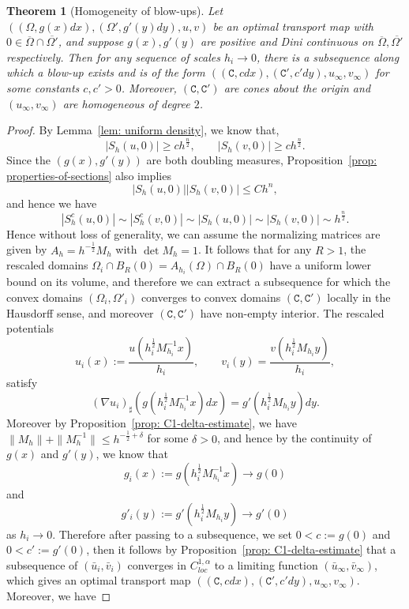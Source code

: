 \documentclass[12pt,reqno]{amsart}
\newtheorem{theorem}{Theorem}[section]
\numberwithin{equation}{section}
\begin{document}
    \begin{theorem}[Homogeneity of blow-ups]\label{thm: homog-of-blowup-lebesgue-measure}
	   Let $((\Omega, g(x)dx), (\Omega', g'(y)dy), u, v)$ be an optimal transport map with $0\in \overline\Omega \cap \overline{\Omega'}$, and suppose $g(x), g'(y)$ are positive and Dini continuous on $\overline\Omega, \overline{\Omega'}$ respectively. Then for any sequence of scales $h_i\to 0$, there is a subsequence along which a blow-up exists and is of the form $((\mathtt C, cdx), (\mathtt C', c'dy), u_{\infty}, v_{\infty})$ for some constants $c, c'>0$. Moreover, $(\mathtt C, \mathtt C')$ are cones about the origin and $(u_{\infty}, v_{\infty})$ are homogeneous of degree $2$. 
	\end{theorem}
        \begin{proof}By Lemma~\ref{lem: uniform density}, we know that,  
        \[|S_h(u, 0)|\geq ch^{\frac n 2},\qquad |S_h(v, 0)|\geq ch^{\frac n 2}.\] Since the $(g(x), g'(y))$ are both doubling measures, Proposition~\ref{prop: properties-of-sections} also implies \[|S_h(u, 0)||S_h(v, 0)|\leq Ch^n,\] and hence we have
        \[|S_h^c(u, 0)|\sim |S_h^c(v, 0)|\sim |S_h(u, 0)|\sim|S_h(v, 0)|\sim h^{\frac n 2}.\]
        Hence without loss of generality, we can assume the normalizing matrices are given by $A_h = h^{-\frac 1 2}M_h$ with $\det M_h = 1$. It follows that for any $R>1$, the rescaled domains $\Omega_i\cap B_R(0) = A_{h_i}(\Omega)\cap B_R(0)$ have a uniform lower bound on its volume, and therefore we can extract a subsequence for which the convex domains $(\Omega_i, \Omega'_i)$ converges to convex domains $(\mathtt C, \mathtt C')$ locally in the Hausdorff sense, and moreover $(\mathtt C, \mathtt C')$ have non-empty interior. 
        The rescaled potentials
        \[u_i(x) := \frac{u(h_i^{\frac 1 2}M_{h_i}^{-1}x)}{h_i}, \qquad v_i(y) = \frac{v(h_i^{\frac 1 2}M_{h_i}y)}{h_i},\]
        satisfy 
        \[(\nabla u_i)_{\sharp}(g(h_i^{\frac 1 2}M_{h_i}^{-1}x)dx) = g'(h_i^{\frac 1 2}M_{h_i}y)dy.\]
        Moreover by Proposition~\ref{prop: C1-delta-estimate}, we have $\|M_h\|+\|M_h^{-1}\|\leq h^{-\frac 1 2+\delta}$ for some $\delta>0$, and hence by the continuity of $g(x)$ and $g'(y)$, we know that 
        \[g_i(x):= g(h_i^{\frac 1 2}M_{h_i}^{-1}x)\to g(0)\] 
        and 
        \[g'_i(y):= g'(h_i^{\frac 1 2}M_{h_i}y)\to g'(0)\] as $h_i\to 0$. 
        Therefore after passing to a subsequence, we set $0<c := g(0)$ and $0<c' := g'(0)$, then it follows by Proposition~\ref{prop: C1-delta-estimate} that a subsequence of $(\bar u_i, \bar v_i)$ converges in $C^{1, \alpha}_{loc}$ to a limiting function $(\bar u_{\infty}, \bar v_{\infty})$, which gives an optimal transport map $((\mathtt C, cdx), (\mathtt C', c'dy), u_{\infty}, v_{\infty})$. Moreover, we have

\end{proof}
\end{document}
